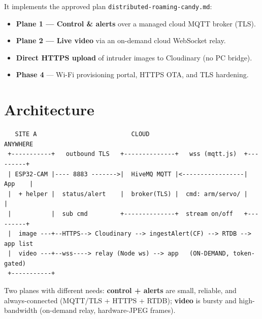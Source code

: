 \documentclass[11pt,a4paper]{article}
\newcommand{\code}[1]{\texttt{#1}}
\begin{document}
It implements the approved plan \code{distributed-roaming-candy.md}:
\begin{itemize}[nosep,leftmargin=1.4em]
  \item \textbf{Plane 1 --- Control \& alerts} over a managed cloud MQTT broker (TLS).
  \item \textbf{Plane 2 --- Live video} via an on-demand cloud WebSocket relay.
  \item \textbf{Direct HTTPS upload} of intruder images to Cloudinary (no PC bridge).
  \item \textbf{Phase 4} --- Wi-Fi provisioning portal, HTTPS OTA, and TLS hardening.
\end{itemize}

\section{Architecture}
\begin{lstlisting}
   SITE A                          CLOUD                          ANYWHERE
 +-----------+   outbound TLS   +--------------+   wss (mqtt.js)  +---------+
 | ESP32-CAM |---- 8883 ------->|  HiveMQ MQTT |<-----------------|  App    |
 |  + helper |  status/alert    |  broker(TLS) |  cmd: arm/servo/ |         |
 |           |  sub cmd         +--------------+  stream on/off   +---------+
 |  image ---+--HTTPS--> Cloudinary --> ingestAlert(CF) --> RTDB --> app list
 |  video ---+--wss----> relay (Node ws) --> app   (ON-DEMAND, token-gated)
 +-----------+
\end{lstlisting}
Two planes with different needs: \textbf{control + alerts} are small, reliable, and
always-connected (MQTT/TLS + HTTPS + RTDB); \textbf{video} is bursty and high-bandwidth
(on-demand relay, hardware-JPEG frames).

\end{document}

